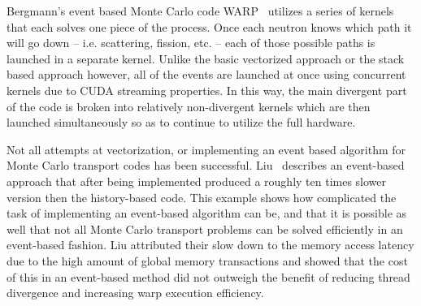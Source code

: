 Bergmann's event based Monte Carlo code WARP~\cite{2014development} utilizes a series of kernels that each solves one piece of the process.
%
Once each neutron knows which path it will go down -- i.e. scattering, fission, etc. -- each of those possible paths is launched in a separate kernel.
%
Unlike the basic vectorized approach or the stack based approach however, all of the events are launched at once using concurrent kernels due to CUDA streaming properties.
%
In this way, the main divergent part of the code is broken into relatively non-divergent kernels which are then launched simultaneously so as to continue to utilize the full hardware.

Not all attempts at vectorization, or implementing an event based algorithm for Monte Carlo transport codes has been successful.
%
Liu~\cite{liu2014comparative} describes an event-based approach that after being implemented produced a roughly ten times slower version then the history-based code.
%
This example shows how complicated the task of implementing an event-based algorithm can be, and that it is possible as well that not all Monte Carlo transport problems can be solved efficiently in an event-based fashion.
%
Liu attributed their slow down to the memory access latency due to the high amount of global memory transactions and showed that the cost of this in an event-based method did not outweigh the benefit of reducing thread divergence and increasing warp execution efficiency.





